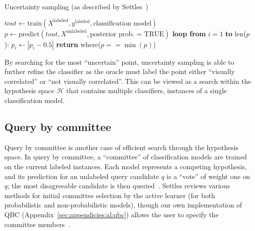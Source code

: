\tablespacing
\begin{algorithm}[H]
	\caption{Uncertainty sampling (as described by 
	Settles~\cite{settles2010})}\label{alg:al:methods:uncertainty}
	\begin{algorithmic}[1]
		\State $\textit{tout} \gets 
		\text{train}(X^{\text{labeled}},y^{\text{labeled}},\text{classification 
		model})$
		\State $p \gets 
		\text{predict}(\textit{tout},X^{\text{unlabeled}},
		\text{posterior prob. = TRUE})$
		\State \textbf{loop from} $i=1$ \textbf{to} len($p$):
		\State \indent $p_i \gets |p_i-0.5|$
		\State \textbf{return} where($p==\min{(p)}$)
		\EndProcedure
	\end{algorithmic}
\end{algorithm}
\bodyspacing

\noindent By searching for the most ``uncertain'' point, uncertainty sampling 
is able to further refine the classifier as the oracle must label the point 
either ``visually correlated'' or ``not visually correlated''. This can be 
viewed as a search within the hypothesis space $\mathcal{H}$ that contains 
multiple classifiers, instances of a single classification model.








\subsection{Query by committee}
\label{sec:al:methods:qbc}

Query by committee is another case of efficient search through the hypothesis 
space. In query by committee, a ``committee'' of classification models are 
trained on the  current labeled instances.  Each model represents a competing 
hypothesis, and its prediction for an unlabeled query candidate $q$ is a 
``vote'' of weight one on $q$; the most disagreeable candidate is then 
queried~\cite{settles2010}. Settles reviews various methods for initial 
committee selection by the active learner (for both probabilistic and 
non-probabilistic models), though our own implementation of QBC 
(Appendix~\ref{sec:appendicies:al:qbc}) allows the user to specify the 
committee members~\cite{settles2010}. 

